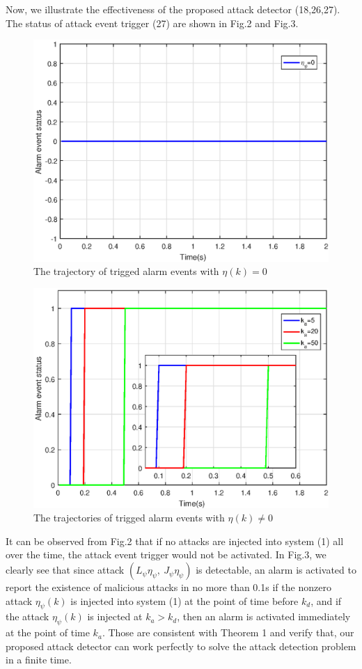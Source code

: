 \documentclass[english]{cccconf}
\theoremstyle{definition}
\begin{document}
 Now, we illustrate the effectiveness of the proposed attack detector (18,26,27). The status of attack event trigger (27) are shown in Fig.2 and Fig.3.
\begin{figure}[htbp]
\includegraphics[width=\hsize]{alarm1.eps}
\caption{The trajectory of trigged alarm events with $\eta(k)=0$}
\end{figure}
\begin{figure}[htbp]
\includegraphics[width=\hsize]{alarmyes.eps}
\caption{The trajectories of trigged alarm events with $\eta(k)\neq 0$}
\end{figure}

It can be observed  from Fig.2 that  if no attacks are injected into system (1) all over the time, the attack event trigger would not be activated.
In Fig.3, we clearly see that since attack $(L_{\psi}\eta_\psi,\ J_{\psi}\eta_\psi)$ is detectable, an alarm is activated to report the existence of malicious attacks in no more than 0.1s if the nonzero attack $\eta_\psi(k)$ is injected into system (1) at the point of time before $k_d$, and if the attack $\eta_\psi(k)$ is injected at $k_a>k_d$, then an alarm is activated immediately at the point of time $k_a$. Those are consistent with Theorem 1 and verify that, our proposed attack detector can work perfectly to solve the attack detection problem in a finite time.
\end{document}

